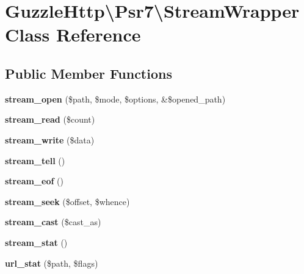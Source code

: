 \hypertarget{classGuzzleHttp_1_1Psr7_1_1StreamWrapper}{}\section{Guzzle\+Http\textbackslash{}Psr7\textbackslash{}Stream\+Wrapper Class Reference}
\label{classGuzzleHttp_1_1Psr7_1_1StreamWrapper}
\subsection*{Public Member Functions}
\begin{DoxyCompactItemize}
\item 
\mbox{\label{classGuzzleHttp_1_1Psr7_1_1StreamWrapper_ab8661ad28f3ca7bb59c78b373e0361a7}} 
{\bfseries stream\+\_\+open} (\$path, \$mode, \$options, \&\$opened\+\_\+path)
\item 
\mbox{\label{classGuzzleHttp_1_1Psr7_1_1StreamWrapper_af96cc0db7c3aa9a17ebb8a53965ce325}} 
{\bfseries stream\+\_\+read} (\$count)
\item 
\mbox{\label{classGuzzleHttp_1_1Psr7_1_1StreamWrapper_a33a797bbae2201ce5980c7e5b55a831b}} 
{\bfseries stream\+\_\+write} (\$data)
\item 
\mbox{\label{classGuzzleHttp_1_1Psr7_1_1StreamWrapper_a92e516eef6cd1ebdfcc373db0dd9f4e8}} 
{\bfseries stream\+\_\+tell} ()
\item 
\mbox{\label{classGuzzleHttp_1_1Psr7_1_1StreamWrapper_abe81ccc18a301339761874415c13f863}} 
{\bfseries stream\+\_\+eof} ()
\item 
\mbox{\label{classGuzzleHttp_1_1Psr7_1_1StreamWrapper_a9a25f903a2b145264dcf06662ce6e2bf}} 
{\bfseries stream\+\_\+seek} (\$offset, \$whence)
\item 
\mbox{\label{classGuzzleHttp_1_1Psr7_1_1StreamWrapper_abe41c12bf3a52cc9f151234b1b77a65a}} 
{\bfseries stream\+\_\+cast} (\$cast\+\_\+as)
\item 
\mbox{\label{classGuzzleHttp_1_1Psr7_1_1StreamWrapper_a819fad544c638896621a3fcf39ba0344}} 
{\bfseries stream\+\_\+stat} ()
\item 
\mbox{\label{classGuzzleHttp_1_1Psr7_1_1StreamWrapper_a9a82938e68c4e92e5cb653ceebea8342}} 
{\bfseries url\+\_\+stat} (\$path, \$flags)
\end{DoxyCompactItemize}
